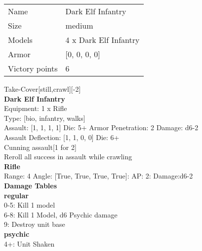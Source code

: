 \begin{tabular}{ll}
  Name & Dark Elf Infantry \\
  Size & medium\\
  Models & 4 x Dark Elf Infantry\\
  Armor & [0, 0, 0, 0]\\
  Victory points & 6\\
\end{tabular}

Take-Cover[still,crawl][-2]\\ 


{\bf Dark Elf Infantry } \\
Equipment: 1 x Rifle \\
Type: [bio, infantry, walks] \\

Assault: [1, 1, 1, 1] Die: 5+ Armor Penetration: 2 Damage: d6-2 \\
Assault Deflection: [1, 1, 0, 0] Die: 6+\\
\indent Cunning assault[1 for 2]\\ 
Reroll all success in assault while crawling\\ 
 



{\bf Rifle } \\



Range: 4  Angle: [True, True, True, True]: AP: 2: Damage:d6-2 \\




 





{\bf Damage Tables} \\
 {\bf regular } \\
0-5: Kill 1 model \\
6-8: Kill 1 Model, d6 Psychic damage \\
9: Destroy unit base \\
 {\bf psychic } \\
4+: Unit Shaken \\










\pagebreak